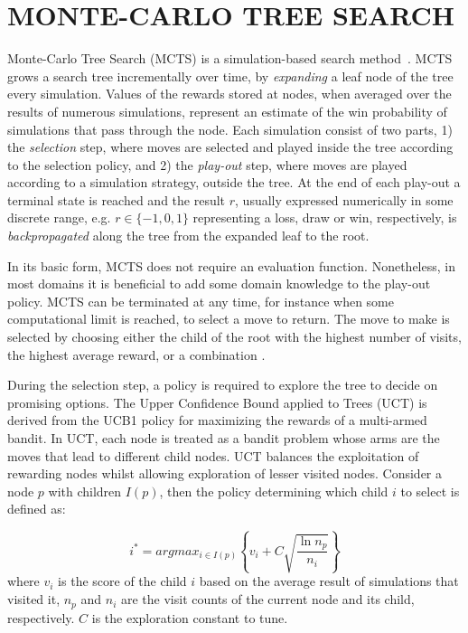 \documentclass{ecai2014}
\begin{document}
\section{MONTE-CARLO TREE SEARCH}
\label{sec:mcts}

Monte-Carlo Tree Search (MCTS) is a simulation-based search method~\cite{coulom2007efficient,kocsis2006bandit}. MCTS grows a search tree incrementally over time, by \emph{expanding} a leaf node of the tree every simulation. Values of the rewards stored at nodes, when averaged over the results of numerous simulations, represent an estimate of the win probability of simulations that pass through the node. 
Each simulation consist of two parts, 1) the \emph{selection} step, where moves are selected and played inside the tree according to the selection policy, and 2) the \emph{play-out} step, where moves are played according to a simulation strategy, outside the tree. At the end of each play-out a terminal state is reached and the result $r$, usually expressed numerically in some discrete range, e.g. $r \in \{-1, 0, 1\}$ representing a loss, draw or win, respectively, is \emph{backpropagated} along the tree from the expanded leaf to the root. 

In its basic form, MCTS does not require an evaluation function. Nonetheless, in most domains it is beneficial to add some domain knowledge to the play-out policy. MCTS can be terminated at any time, for instance when some computational limit is reached, to select a move to return. The move to make is selected by choosing either the child of the root with the highest number of visits, the highest average reward, or a combination \cite{chaslot2008progressive}. 

During the selection step, a policy is required to explore the tree to decide on promising options. The Upper Confidence Bound applied to Trees (UCT) \cite{kocsis2006bandit} is derived from the UCB1 policy \cite{auer2002using} for maximizing the rewards of a multi-armed bandit. In UCT, each node is treated as a bandit problem whose arms are the moves that lead to different child nodes. UCT balances the exploitation of rewarding nodes whilst allowing exploration of lesser visited nodes. Consider a node $p$ with children $I(p)$, then the policy determining which child $i$ to select is defined as:

\begin{equation}
\label{eq:uct}
i^* = argmax_{i \in I(p)}\left\{ v_i + C \sqrt{ \frac{\ln{n_p}}{n_i}}\right\}
\end{equation}
where $v_i$ is the score of the child $i$ based on the average result of simulations that visited it, $n_p$ and $n_i$ are the visit counts of the current node and its child, respectively. $C$ is the exploration constant to tune. 
\end{document}
